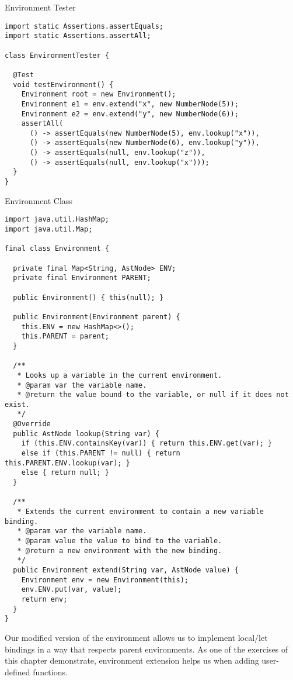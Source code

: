 \begin{cl}[]{Environment Tester}
\begin{lstlisting}[language=MyJava]
import static Assertions.assertEquals;
import static Assertions.assertAll;

class EnvironmentTester {
  
  @Test
  void testEnvironment() {
    Environment root = new Environment();
    Environment e1 = env.extend("x", new NumberNode(5));
    Environment e2 = env.extend("y", new NumberNode(6));
    assertAll(
      () -> assertEquals(new NumberNode(5), env.lookup("x")),
      () -> assertEquals(new NumberNode(6), env.lookup("y")),
      () -> assertEquals(null, env.lookup("z")),
      () -> assertEquals(null, env.lookup("x")));
  }
}
\end{lstlisting}
\end{cl}
  
\begin{cl}[]{Environment Class}
\begin{lstlisting}[language=MyJava]
import java.util.HashMap;
import java.util.Map;

final class Environment {

  private final Map<String, AstNode> ENV;
  private final Environment PARENT;

  public Environment() { this(null); }

  public Environment(Environment parent) { 
    this.ENV = new HashMap<>(); 
    this.PARENT = parent; 
  }

  /**
   * Looks up a variable in the current environment.
   * @param var the variable name.
   * @return the value bound to the variable, or null if it does not exist.
   */
  @Override
  public AstNode lookup(String var) {
    if (this.ENV.containsKey(var)) { return this.ENV.get(var); }
    else if (this.PARENT != null) { return this.PARENT.ENV.lookup(var); }
    else { return null; }
  }

  /**
   * Extends the current environment to contain a new variable binding.
   * @param var the variable name.
   * @param value the value to bind to the variable.
   * @return a new environment with the new binding.
   */
  public Environment extend(String var, AstNode value) {
    Environment env = new Environment(this);
    env.ENV.put(var, value);
    return env;
  }
}
\end{lstlisting}
\end{cl} 

Our modified version of the environment allows us to implement local/let bindings in a way that respects parent environments. As one of the exercises of this chapter demonstrate, environment extension helps us when adding user-defined functions.

